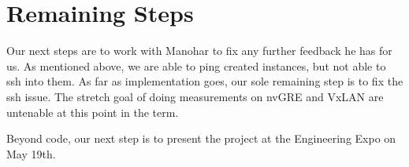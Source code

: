 \documentclass[10pt,onecolumn,journal,draftclsnofoot]{IEEEtran}
\begin{document}

\section{Remaining Steps}

Our next steps are to work with Manohar to fix any further feedback he has for
us. As mentioned above, we are able to ping created instances, but not able to
ssh into them. As far as implementation goes, our sole remaining step is to fix
the ssh issue. The stretch goal of doing measurements on nvGRE and VxLAN are
untenable at this point in the term.

Beyond code, our next step is to present the project at the Engineering Expo on
May 19th.



\end{document}
